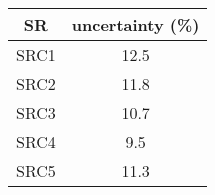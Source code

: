 \begin{tabular}{c||c} \hline\hline
{\bf SR} & {\bf uncertainty (\%)} \\ \hline
SRC1 & 12.5\\ \hline
SRC2 & 11.8\\ \hline
SRC3 & 10.7\\ \hline
SRC4 & 9.5\\ \hline
SRC5 & 11.3\\ \hline
\hline
\end{tabular}
